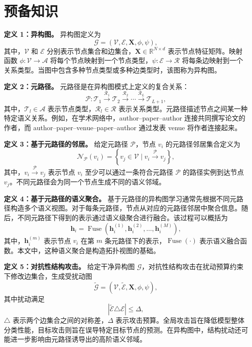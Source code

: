 \section{预备知识}
\label{sec:preliminaries-zh}

\noindent\textbf{定义 1：异构图。}
异构图定义为
\begin{equation}
\mathcal{G}=(\mathcal{V},\mathcal{E},\mathbf{X},\phi,\psi),
\end{equation}
其中，$\mathcal{V}$ 和 $\mathcal{E}$ 分别表示节点集合和边集合，$\mathbf{X}\in\mathbb{R}^{N\times d}$ 表示节点特征矩阵。映射函数 $\phi:\mathcal{V}\rightarrow\mathcal{A}$ 将每个节点映射到一个节点类型，$\psi:\mathcal{E}\rightarrow\mathcal{R}$ 将每条边映射到一个关系类型。当图中包含多种节点类型或多种边类型时，该图称为异构图。

\noindent\textbf{定义 2：元路径。}
元路径是在异构图模式上定义的复合关系：
\begin{equation}
\mathcal{P}:
\mathcal{T}_1 \xrightarrow{\mathcal{R}_1}
\mathcal{T}_2 \xrightarrow{\mathcal{R}_2}
\cdots
\xrightarrow{\mathcal{R}_L}
\mathcal{T}_{L+1},
\end{equation}
其中，$\mathcal{T}_l\in\mathcal{A}$ 表示节点类型，$\mathcal{R}_l\in\mathcal{R}$ 表示关系类型。元路径描述节点之间某一种特定语义关系。例如，在学术网络中，author--paper--author 连接共同撰写论文的作者，而 author--paper--venue--paper--author 通过发表 venue 将作者连接起来。

\noindent\textbf{定义 3：基于元路径的邻居。}
给定元路径 $\mathcal{P}$，节点 $v_i$ 的元路径邻居集合定义为
\begin{equation}
\mathcal{N}_{\mathcal{P}}(v_i)
= \left\{ v_j \in \mathcal{V} \mid v_i \xrightarrow{\mathcal{P}} v_j \right\},
\end{equation}
其中，$v_i \xrightarrow{\mathcal{P}} v_j$ 表示节点 $v_i$ 至少可以通过一条符合元路径 $\mathcal{P}$ 的路径实例到达节点 $v_j$。不同元路径会为同一个节点生成不同的语义邻域。

\noindent\textbf{定义 4：基于元路径的语义聚合。}
基于元路径的异构图学习通常先根据不同元路径构造多个语义视图。对于每条元路径，节点从对应的元路径邻居中聚合信息。随后，不同元路径下得到的表示通过语义级聚合进行融合。该过程可以概括为
\begin{equation}
\mathbf{h}_i
=
\operatorname{Fuse}
\left(
\mathbf{h}_i^{(1)},\mathbf{h}_i^{(2)},\ldots,\mathbf{h}_i^{(M)}
\right),
\end{equation}
其中，$\mathbf{h}_i^{(m)}$ 表示节点 $v_i$ 在第 $m$ 条元路径下的表示，$\operatorname{Fuse}(\cdot)$ 表示语义融合函数。本文中，这种语义聚合是构造拓扑视图的基础。

\noindent\textbf{定义 5：对抗性结构攻击。}
给定干净异构图 $\mathcal{G}$，对抗性结构攻击在扰动预算约束下修改边集合，生成受扰动图
\begin{equation}
\widetilde{\mathcal{G}}
=
(\mathcal{V},\widetilde{\mathcal{E}},\mathbf{X},\phi,\psi),
\end{equation}
其中扰动满足
\begin{equation}
|\widetilde{\mathcal{E}}\triangle\mathcal{E}| \leq \Delta,
\end{equation}
$\triangle$ 表示两个边集合之间的对称差，$\Delta$ 表示攻击预算。全局攻击旨在降低模型整体分类性能，目标攻击则旨在误导特定目标节点的预测。在异构图中，结构扰动还可能进一步影响由元路径诱导出的高阶语义邻域。
